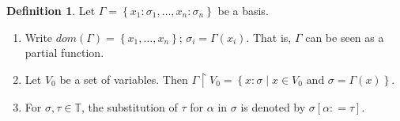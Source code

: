 \documentclass{llncs}
\theoremstyle{definition}
\newtheorem{mydef}{Definition}
\numberwithin{mydef}{subsection}
\theoremstyle{plain}
\theoremstyle{remark}
\begin{document}
	\begin{mydef}
		Let $\Gamma = \left \{ x _{1} : \sigma _{1}, \dots, x _{n} : \sigma _{n} \right \}$ be a basis.
		\begin{enumerate}
			\item Write $dom {\left( \Gamma \right)} = \left \{ x _{1}, \dots, x _{n} \right \}$; $\sigma _{i} = \Gamma {\left( x _{i} \right)}$. That is, $\Gamma$ can be seen as a partial function.
			\item Let $V _{0}$ be a set of variables. Then $\Gamma \upharpoonright V _{0} = \left \{ x : \sigma \mid x \in V _{0} \text{ and } \sigma = \Gamma {\left( x \right)} \right \}$.
			\item For $\sigma, \tau \in \mathbb{T}$, the substitution of $\tau$ for $\alpha$ in $\sigma$ is denoted by $\sigma {\left[ \alpha : = \tau \right]}$. \\
		\end{enumerate}
	\end{mydef}
	
\end{document}
